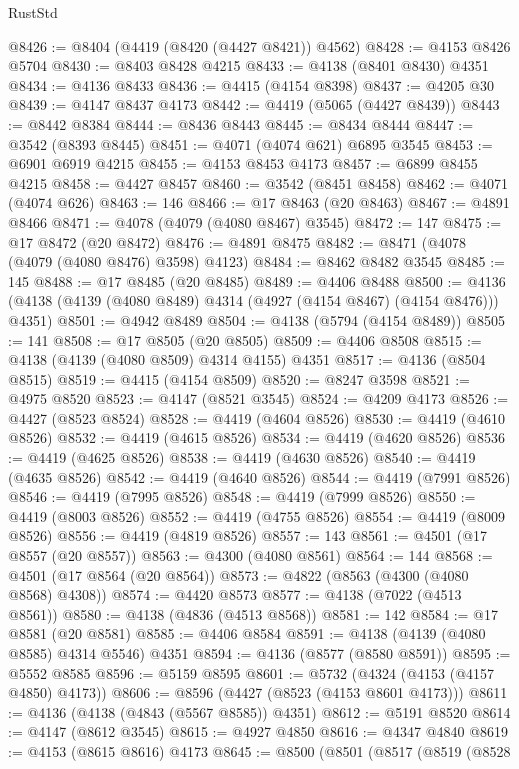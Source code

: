 \begin{lexlean}{RustStd}
\begin{coremodule}
@8426 := @8404 (@4419 (@8420 (@4427 @8421)) @4562)
@8428 := @4153 @8426 @5704
@8430 := @8403 @8428 @4215
@8433 := @4138 (@8401 @8430) @4351
@8434 := @4136 @8433
@8436 := @4415 (@4154 @8398)
@8437 := @4205 @30
@8439 := @4147 @8437 @4173
@8442 := @4419 (@5065 (@4427 @8439))
@8443 := @8442 @8384
@8444 := @8436 @8443
@8445 := @8434 @8444
@8447 := @3542 (@8393 @8445)
@8451 := @4071 (@4074 @621) @6895 @3545
@8453 := @6901 @6919 @4215
@8455 := @4153 @8453 @4173
@8457 := @6899 @8455 @4215
@8458 := @4427 @8457
@8460 := @3542 (@8451 @8458)
@8462 := @4071 (@4074 @626)
@8463 := 146
@8466 := @17 @8463 (@20 @8463)
@8467 := @4891 @8466
@8471 := @4078 (@4079 (@4080 @8467) @3545)
@8472 := 147
@8475 := @17 @8472 (@20 @8472)
@8476 := @4891 @8475
@8482 := @8471 (@4078 (@4079 (@4080 @8476) @3598) @4123)
@8484 := @8462 @8482 @3545
@8485 := 145
@8488 := @17 @8485 (@20 @8485)
@8489 := @4406 @8488
@8500 := @4136 (@4138 (@4139 (@4080 @8489) @4314 (@4927 (@4154 @8467) (@4154 @8476))) @4351)
@8501 := @4942 @8489
@8504 := @4138 (@5794 (@4154 @8489))
@8505 := 141
@8508 := @17 @8505 (@20 @8505)
@8509 := @4406 @8508
@8515 := @4138 (@4139 (@4080 @8509) @4314 @4155) @4351
@8517 := @4136 (@8504 @8515)
@8519 := @4415 (@4154 @8509)
@8520 := @8247 @3598
@8521 := @4975 @8520
@8523 := @4147 (@8521 @3545)
@8524 := @4209 @4173
@8526 := @4427 (@8523 @8524)
@8528 := @4419 (@4604 @8526)
@8530 := @4419 (@4610 @8526)
@8532 := @4419 (@4615 @8526)
@8534 := @4419 (@4620 @8526)
@8536 := @4419 (@4625 @8526)
@8538 := @4419 (@4630 @8526)
@8540 := @4419 (@4635 @8526)
@8542 := @4419 (@4640 @8526)
@8544 := @4419 (@7991 @8526)
@8546 := @4419 (@7995 @8526)
@8548 := @4419 (@7999 @8526)
@8550 := @4419 (@8003 @8526)
@8552 := @4419 (@4755 @8526)
@8554 := @4419 (@8009 @8526)
@8556 := @4419 (@4819 @8526)
@8557 := 143
@8561 := @4501 (@17 @8557 (@20 @8557))
@8563 := @4300 (@4080 @8561)
@8564 := 144
@8568 := @4501 (@17 @8564 (@20 @8564))
@8573 := @4822 (@8563 (@4300 (@4080 @8568) @4308))
@8574 := @4420 @8573
@8577 := @4138 (@7022 (@4513 @8561))
@8580 := @4138 (@4836 (@4513 @8568))
@8581 := 142
@8584 := @17 @8581 (@20 @8581)
@8585 := @4406 @8584
@8591 := @4138 (@4139 (@4080 @8585) @4314 @5546) @4351
@8594 := @4136 (@8577 (@8580 @8591))
@8595 := @5552 @8585
@8596 := @5159 @8595
@8601 := @5732 (@4324 (@4153 (@4157 @4850) @4173))
@8606 := @8596 (@4427 (@8523 (@4153 @8601 @4173)))
@8611 := @4136 (@4138 (@4843 (@5567 @8585)) @4351)
@8612 := @5191 @8520
@8614 := @4147 (@8612 @3545)
@8615 := @4927 @4850
@8616 := @4347 @4840
@8619 := @4153 (@8615 @8616) @4173
@8645 := @8500
    (@8501
      (@8517
        (@8519
          (@8528

\end{coremodule}
\end{lexlean}
